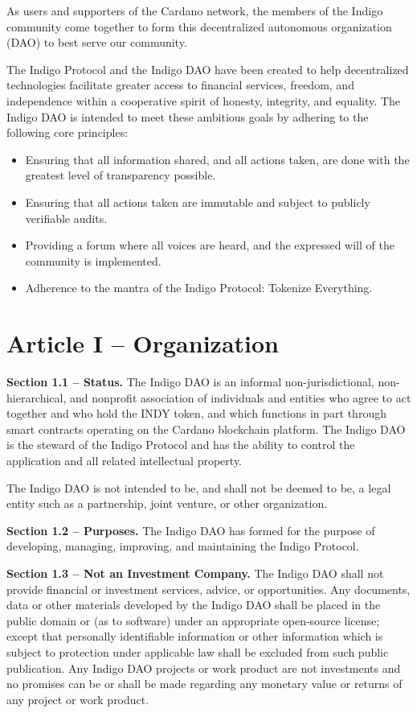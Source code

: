 As users and supporters of the Cardano network, the members of the
Indigo community come together to form this decentralized autonomous
organization (DAO) to best serve our community.

The Indigo Protocol and the Indigo DAO have been created to help
decentralized technologies facilitate greater access to financial
services, freedom, and independence within a cooperative spirit of
honesty, integrity, and equality. The Indigo DAO is intended to meet
these ambitious goals by adhering to the following core principles:

\begin{itemize}
\item
  Ensuring that all information shared, and all actions taken, are done
  with the greatest level of transparency possible.
\item
  Ensuring that all actions taken are immutable and subject to publicly
  verifiable audits.
\item
  Providing a forum where all voices are heard, and the expressed will
  of the community is implemented.
\item
  Adherence to the mantra of the Indigo Protocol: Tokenize Everything.
\end{itemize}

\hypertarget{article-i-organization}{%
\section{Article I -- Organization}\label{article-i-organization}}

\textbf{Section 1.1 -- Status.} The Indigo DAO is an informal
non-jurisdictional, non-hierarchical, and nonprofit association of
individuals and entities who agree to act together and who hold the INDY
token, and which functions in part through smart contracts operating on
the Cardano blockchain platform. The Indigo DAO is the steward of the
Indigo Protocol and has the ability to control the application and all
related intellectual property.

The Indigo DAO is not intended to be, and shall not be deemed to be, a
legal entity such as a partnership, joint venture, or other
organization.

\textbf{Section 1.2 -- Purposes.} The Indigo DAO has formed for the
purpose of developing, managing, improving, and maintaining the Indigo
Protocol.

\textbf{Section 1.3 -- Not an Investment Company.} The Indigo DAO shall
not provide financial or investment services, advice, or opportunities.
Any documents, data or other materials developed by the Indigo DAO shall
be placed in the public domain or (as to software) under an appropriate
open-source license; except that personally identifiable information or
other information which is subject to protection under applicable law
shall be excluded from such public publication. Any Indigo DAO projects
or work product are not investments and no promises can be or shall be
made regarding any monetary value or returns of any project or work
product.


